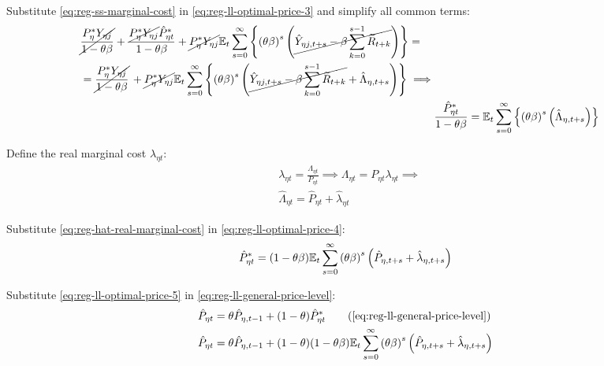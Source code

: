 \documentclass[
thesis.tex
]{subfiles}
\begin{document}
Substitute \ref{eq:reg-ss-marginal-cost} in \ref{eq:reg-ll-optimal-price-3} and simplify all common terms:
\begin{align}
	\begin{split}
		& \cancel{\frac{P_{\eta}^{\ast} Y_{\eta j}}{1-\theta\beta}} + \frac{ \cancel{P_{\eta}^{\ast} Y_{\eta j}} \hat{P}_{\eta t}^{\ast}}{1- \theta \beta} + \cancel{P_{\eta}^{\ast} Y_{\eta j}} {\mathbb{E}_{t}} \sum_{s=0}^{\infty} \left\{ \left( \theta \beta \right)^s \left( \cancel{\hat{Y}_{\eta j, t+s} - \beta \sum_{k=0}^{s-1} \widetilde{R}_{t+k}} \right) \right\} = 
		\\
		& = \cancel{\frac{P_{\eta}^{\ast} Y_{\eta j}}{1-\theta\beta}} \, + \cancel{P_{\eta}^{\ast} Y_{\eta j}} {\mathbb{E}_{t}} \sum_{s=0}^{\infty} \left\{ \left( \theta \beta \right)^s \left( \cancel{\hat{Y}_{\eta j, t+s} - \beta \sum_{k=0}^{s-1} \widetilde{R}_{t+k}} + \hat{\Lambda}_{\eta, t+s} \right) \right\} \implies	
	\end{split} \nonumber \\
	& \frac{ \hat{P}_{\eta t}^{\ast}}{1- \theta \beta} = {\mathbb{E}_{t}} \sum_{s=0}^{\infty} \left\{ \left( \theta \beta \right)^s \left( \hat{\Lambda}_{\eta, t+s} \right) \right\} \label{eq:reg-ll-optimal-price-4}
\end{align}



Define the real marginal cost $\lambda_{\eta t}$:
\begin{align}
	& \lambda_{\eta t} = \frac{\Lambda_{\eta t}}{P_{\eta t}} \implies \Lambda_{\eta t} = P_{\eta t} \lambda_{\eta t} \implies \nonumber \\
	& \hat{\Lambda}_{\eta t} = \hat{P}_{\eta t} + \hat{\lambda}_{\eta t} \label{eq:reg-hat-real-marginal-cost}
\end{align}

Substitute \ref{eq:reg-hat-real-marginal-cost} in \ref{eq:reg-ll-optimal-price-4}:
\begin{align}
	\hat{P}_{\eta t}^{\ast} = (1- \theta \beta) {\mathbb{E}_{t}} \sum_{s=0}^{\infty} \left( \theta \beta \right)^s \left( \hat{P}_{\eta, t+s} + \hat{\lambda}_{\eta, t+s} \right) \label{eq:reg-ll-optimal-price-5}
\end{align}

Substitute \ref{eq:reg-ll-optimal-price-5} in \ref{eq:reg-ll-general-price-level}:
\begin{align}
	\hat{P}_{\eta t} &= \theta \hat{P}_{\eta, t-1} + (1-\theta) \hat{P}_{\eta t}^{\ast} \tag{\ref{eq:reg-ll-general-price-level}}\\
	\hat{P}_{\eta t} &= \theta \hat{P}_{\eta, t-1} + (1-\theta) (1- \theta \beta) \E \sum_{s=0}^{\infty} \left( \theta \beta \right)^s \left( \hat{P}_{\eta, t+s} + \hat{\lambda}_{\eta, t+s} \right) \label{eq:reg-ll-general-price-level-2}
\end{align}
\end{document}
